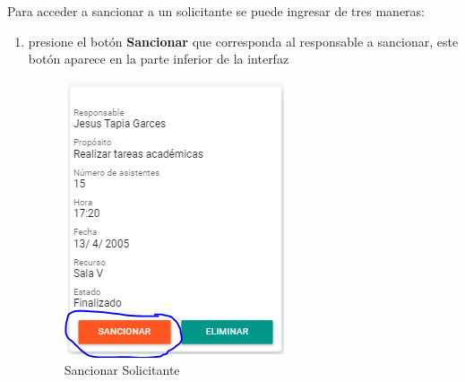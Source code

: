 	Para acceder a sancionar a un solicitante se puede ingresar de tres maneras:
	\begin{enumerate}
		\item presione el botón \textbf{Sancionar} que corresponda 
			al responsable a sancionar, este botón aparece en la parte 
			inferior de la interfaz
		\begin{figure}[hbtp]

	\includegraphics[scale=0.3]{images/InterfazMovil/IUGS07_sancionarBoton.PNG}
	\caption{Sancionar Solicitante}
	\end{figure}	 
		
	\end{enumerate}

	